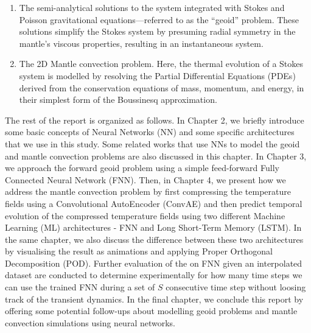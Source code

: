 \begin{enumerate}
    \item The semi-analytical solutions to the system integrated with Stokes and Poisson gravitational equations—referred to as the ``geoid'' problem. These solutions simplify the Stokes system by presuming radial symmetry in the mantle's viscous properties, resulting in an instantaneous system.

    \item The 2D Mantle convection problem. Here, the thermal evolution of a Stokes system is modelled by resolving the Partial Differential Equations (PDEs) derived from the conservation equations of mass, momentum, and energy, in their simplest form of the Boussinesq approximation. 
\end{enumerate}

The rest of the report is organized as follows. In Chapter 2, we briefly introduce some basic concepts of Neural Networks (NN) and some specific architectures that we use in this study. Some related works that use NNs to model the geoid and mantle convection problems are also discussed in this chapter. In Chapter 3, we approach the forward geoid problem using a simple feed-forward Fully Connected Neural Network (FNN). Then, in Chapter 4, we present how we address the mantle convection problem by first compressing the temperature fields using a Convolutional AutoEncoder (ConvAE) and then predict temporal evolution of the compressed temperature fields using two different Machine Learning (ML) architectures - FNN and Long Short-Term Memory (LSTM). In the same chapter, we also discuss the difference between these two architectures by visualising the result as animations and applying Proper Orthogonal Decomposition (POD). Further evaluation of the on FNN given an interpolated dataset are conducted to determine experimentally for how many time steps we can use the trained FNN during a set of $S$ consecutive time step without loosing track of the transient dynamics. In the final chapter, we conclude this report by offering some potential follow-ups about modelling geoid problems and mantle convection simulations using neural networks.